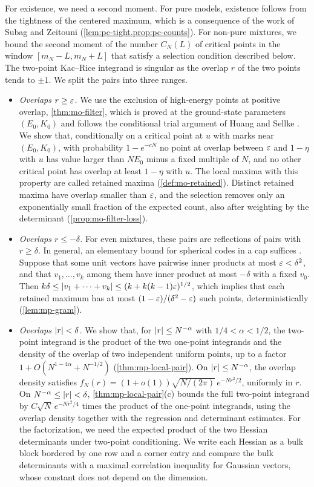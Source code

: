 For existence, we need a second moment. For pure models, existence follows from the tightness of the centered maximum, which is a consequence of the work of Subag and Zeitouni \cite{SubagZeitouni2017} (\cref{lem:pc-tight,prop:pc-counts}). For non-pure mixtures, we bound the second moment of the number $C_N(L)$ of critical points in the window $[m_N-L,m_N+L]$ that satisfy a selection condition described below. The two-point Kac--Rice integrand is singular as the overlap $r$ of the two points tends to $\pm1$. We split the pairs into three ranges.
\begin{itemize}
\item \emph{Overlaps $r\ge\varepsilon$.} We use the exclusion of high-energy points at positive overlap, \cref{thm:mo-filter}, which is proved at the ground-state parameters $(E_0,K_0)$ and follows the conditional trial argument of Huang and Sellke \cite[Section~3.3]{HuangSellke2024}. We show that, conditionally on a critical point at $u$ with marks near $(E_0,K_0)$, with probability $1-e^{-cN}$ no point at overlap between $\varepsilon$ and $1-\eta$ with $u$ has value larger than $NE_0$ minus a fixed multiple of $N$, and no other critical point has overlap at least $1-\eta$ with $u$. The local maxima with this property are called retained maxima (\cref{def:mo-retained}). Distinct retained maxima have overlap smaller than $\varepsilon$, and the selection removes only an exponentially small fraction of the expected count, also after weighting by the determinant (\cref{prop:mo-filter-loss}).
\item \emph{Overlaps $r\le-\delta$.} For even mixtures, these pairs are reflections of pairs with $r\ge\delta$. In general, an elementary bound for spherical codes in a cap suffices \cite{Rankin1955,BargMusin2007}. Suppose that some unit vectors have pairwise inner products at most $\varepsilon<\delta^2$, and that $v_1,\dots,v_k$ among them have inner product at most $-\delta$ with a fixed $v_0$. Then $k\delta\le\left|v_1+\dots+v_k\right|\le(k+k(k-1)\varepsilon)^{1/2}$, which implies that each retained maximum has at most $(1-\varepsilon)/(\delta^2-\varepsilon)$ such points, deterministically (\cref{lem:mp-gram}).
\item \emph{Overlaps $\left|r\right|<\delta$.} We show that, for $\left|r\right|\le N^{-\alpha}$ with $1/4<\alpha<1/2$, the two-point integrand is the product of the two one-point integrands and the density of the overlap of two independent uniform points, up to a factor $1+O(N^{1-4\alpha}+N^{-1/2})$ (\cref{thm:mp-local-pair}). On $\left|r\right|\le N^{-\alpha}$, the overlap density satisfies $f_N(r)=(1+o(1))\sqrt{N/(2\pi)}\,e^{-Nr^2/2}$, uniformly in $r$. On $N^{-\alpha}\le\left|r\right|<\delta$, \cref{thm:mp-local-pair}(c) bounds the full two-point integrand by $C\sqrt N\,e^{-Nr^2/4}$ times the product of the one-point integrands, using the overlap density together with the regression and determinant estimates. For the factorization, we need the expected product of the two Hessian determinants under two-point conditioning. We write each Hessian as a bulk block bordered by one row and a corner entry and compare the bulk determinants with a maximal correlation inequality for Gaussian vectors, whose constant does not depend on the dimension.
\end{itemize}
